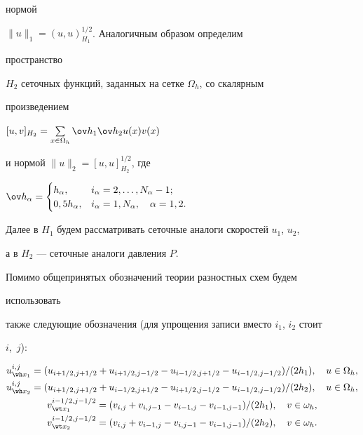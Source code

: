 нормой


$\|u\|_{1}=(u,u)_{H_1}^{1/2}$. Аналогичным образом определим


пространство


$H_2$ сеточных функций, заданных на сетке $\Omega_h$, со скалярным


произведением


$[u,v]_{H_2}=\sum\limits_{x\in\Omega_h}\ov h_1\ov


h_2u(x)v(x)$


и нормой $\|u\|_{2}=[u,u]_{H_2}^{1/2}$, где


$\ov h_\alpha=\begin{cases}


h_\alpha, & i_\alpha=2,\dotsc,N_\alpha-1; \\


0,5h_\alpha, & i_\alpha=1,N_\alpha,\quad \alpha=1,2.\end{cases}$


Далее в $H_1$ будем рассматривать сеточные аналоги скоростей $u_1$, $u_2$,


а в $H_2$ --- сеточные аналоги давления $P$.





Помимо общепринятых обозначений теории разностных схем будем


использовать


также следующие обозначения (для упрощения записи вместо $i_1$, $i_2$ стоит


$i$,~$j$):


\begin{gather*}


u_{\wh x_1}^{i,j}=(u_{i+1/2,j+1/2}+u_{i+1/2,j-1/2}-


u_{i-1/2,j+1/2}-u_{i-1/2,j-1/2})/(2h_1),\quad


u\in\Omega_h,\\


u_{\wh x_2}^{i,j}=(u_{i+1/2,j+1/2}+u_{i-1/2,j+1/2}-


u_{i+1/2,j-1/2}-u_{i-1/2,j-1/2})/(2h_2),\quad u\in\Omega_h, \\


v_{\wt x_1}^{i-1/2,j-1/2}=(v_{i,j}+v_{i,j-1}-


v_{i-1,j}-v_{i-1,j-1})/(2h_1),\quad v\in\omega_h,\\


v_{\wt x_2}^{i-1/2,j-1/2}=(v_{i,j}+v_{i-1,j}-


v_{i,j-1}-v_{i-1,j-1})/(2h_2),\quad v\in\omega_h.


\end{gather*}





